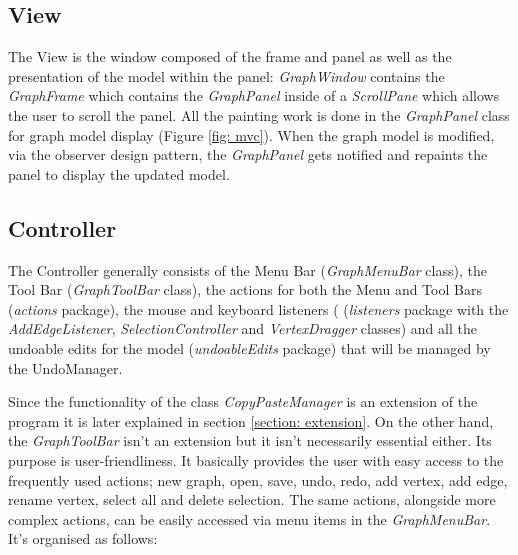 \documentclass[a4paper]{article}
\begin{document}
\subsection{View}
\par The View is the window composed of the frame and panel as well as the presentation of the model within the panel: \textit{GraphWindow} contains the \textit{GraphFrame} which contains the \textit{GraphPanel} inside of a \textit{ScrollPane} which allows the user to scroll the panel. All the painting work is done in the \textit{GraphPanel} class for graph model display (Figure \ref{fig: mvc}). When the graph model is modified, via the observer design pattern, the \textit{GraphPanel} gets notified and repaints the panel to display the updated model.

\subsection{Controller}
\par The Controller generally consists of the Menu Bar (\textit{GraphMenuBar} class), the Tool Bar  (\textit{GraphToolBar} class), the actions for both the Menu and Tool Bars  (\textit{actions} package), the mouse and keyboard listeners ( (\textit{listeners} package with the \textit{AddEdgeListener}, \textit{SelectionController} and \textit{VertexDragger} classes) and all the undoable edits for the model (\textit{undoableEdits} package) that will be managed by the UndoManager.
\par Since the functionality of the class \textit{CopyPasteManager} is an extension of the program it is later explained in section \ref{section: extension}. On the other hand, the \textit{GraphToolBar} isn't an extension but it isn't necessarily essential either. Its purpose is user-friendliness. It basically provides the user with easy access to the frequently used actions; new graph, open, save, undo, redo, add vertex, add edge, rename vertex, select all and delete selection. The same actions, alongside more complex actions, can be easily accessed via menu items in the \textit{GraphMenuBar}. It's organised as follows:
\end{document}
